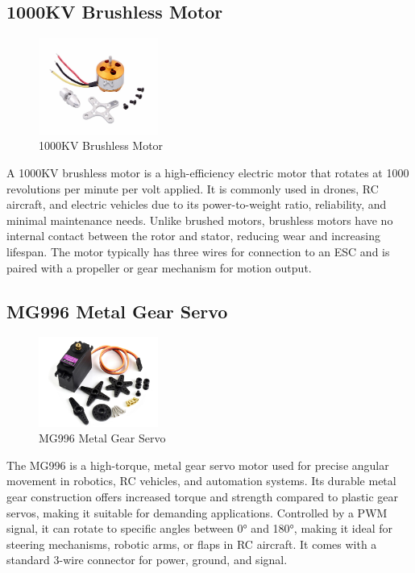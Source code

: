 \subsection{1000KV Brushless Motor}
\begin{figure}[H]
\centering
\includegraphics[width=0.35\textwidth]{images/100 kv brushless motor.jpg}
\caption{1000KV Brushless Motor}
\end{figure}
A 1000KV brushless motor is a high-efficiency electric motor that rotates at 1000 revolutions per minute per volt applied. It is commonly used in drones, RC aircraft, and electric vehicles due to its power-to-weight ratio, reliability, and minimal maintenance needs. Unlike brushed motors, brushless motors have no internal contact between the rotor and stator, reducing wear and increasing lifespan. The motor typically has three wires for connection to an ESC and is paired with a propeller or gear mechanism for motion output.

\subsection{MG996 Metal Gear Servo}
\begin{figure}[H]
\centering
\includegraphics[width=0.35\textwidth]{images/MG 996 motor gear servo.jpg}
\caption{MG996 Metal Gear Servo}
\end{figure}
The MG996 is a high-torque, metal gear servo motor used for precise angular movement in robotics, RC vehicles, and automation systems. Its durable metal gear construction offers increased torque and strength compared to plastic gear servos, making it suitable for demanding applications. Controlled by a PWM signal, it can rotate to specific angles between 0° and 180°, making it ideal for steering mechanisms, robotic arms, or flaps in RC aircraft. It comes with a standard 3-wire connector for power, ground, and signal.

